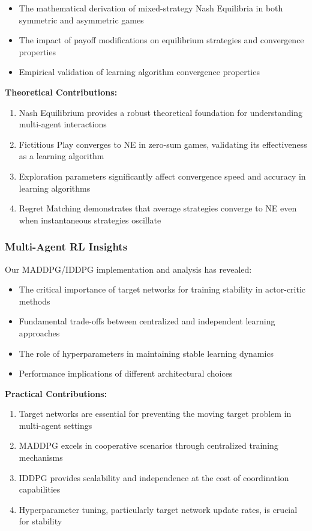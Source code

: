 \documentclass[conference]{IEEEtran}
\begin{document}
{{\begin{itemize}
    \item The mathematical derivation of mixed-strategy Nash Equilibria in both symmetric and asymmetric games
    \item The impact of payoff modifications on equilibrium strategies and convergence properties
    \item Empirical validation of learning algorithm convergence properties
\end{itemize}

\textbf{Theoretical Contributions:}
\begin{enumerate}
    \item Nash Equilibrium provides a robust theoretical foundation for understanding multi-agent interactions
    \item Fictitious Play converges to NE in zero-sum games, validating its effectiveness as a learning algorithm
    \item Exploration parameters significantly affect convergence speed and accuracy in learning algorithms
    \item Regret Matching demonstrates that average strategies converge to NE even when instantaneous strategies oscillate
\end{enumerate}

\subsubsection{Multi-Agent RL Insights}

Our MADDPG/IDDPG implementation and analysis has revealed:

\begin{itemize}
    \item The critical importance of target networks for training stability in actor-critic methods
    \item Fundamental trade-offs between centralized and independent learning approaches
    \item The role of hyperparameters in maintaining stable learning dynamics
    \item Performance implications of different architectural choices
\end{itemize}

\textbf{Practical Contributions:}
\begin{enumerate}
    \item Target networks are essential for preventing the moving target problem in multi-agent settings
    \item MADDPG excels in cooperative scenarios through centralized training mechanisms
    \item IDDPG provides scalability and independence at the cost of coordination capabilities
    \item Hyperparameter tuning, particularly target network update rates, is crucial for stability
\end{enumerate}

}}
\end{document}
